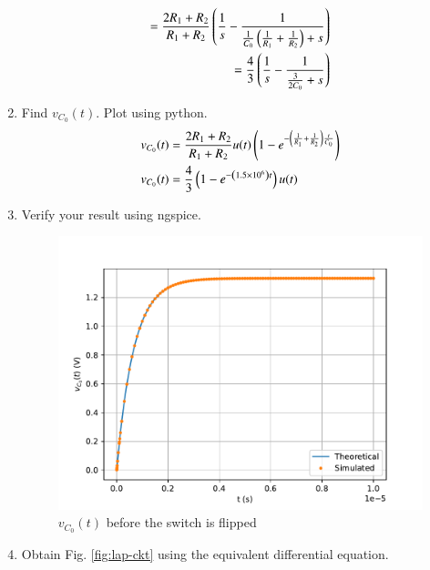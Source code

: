 \documentclass[journal,12pt,twocolumn]{IEEEtran}
\renewcommand\thesection{\arabic{section}}
\begin{document}
\begin{enumerate}[label=\arabic*.,ref=\thesection.\theenumi]
\begin{align}
	= \frac{2R_1 + R_2}{R_1 + R_2}\left(\frac{1}{s} - \frac{1}{\frac{1}{C_0}\left(\frac{1}{R_1} + \frac{1}{R_2}\right) + s}\right) \\
	= \frac{4}{3}\left(\frac{1}{s} - \frac{1}{\frac{3}{2C_0} + s}\right)
	\label{eq:V-s}
\end{align}
\item Find $v_{C_0}(t)$.  Plot using python.
\begin{align}
	& v_{C_0}(t) = \frac{2R_1 + R_2}{R_1 + R_2}u(t)\left(1 - e^{-\left(\frac{1}{R_1} + \frac{1}{R_2}\right)\frac{t}{C_0}}\right) \\
	&v_{C_0}(t) = \frac{4}{3}\left(1 - e^{-\left(1.5 \times 10^6\right)t}\right)u(t)
\end{align}
\item Verify your result using ngspice.\\
\solution
\begin{figure}[!htb]
\includegraphics[width=\columnwidth]{./figs/e2.6.pdf}
\caption{$v_{C_0}(t)$ before the switch is flipped}
\label{fig:v1-t}
\end{figure}
\vspace{3cm}
\item Obtain Fig. 
\ref{fig:lap-ckt}
using the equivalent differential equation.
\end{enumerate}
\end{document}
